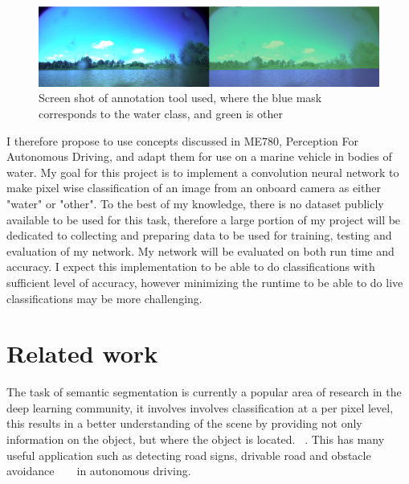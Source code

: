 \documentclass[10pt,twocolumn,letterpaper]{article}
\begin{document}
\begin{figure}[b]	
\begin{center}
  \includegraphics[width=1.0\linewidth]{segmenttool.png}
\end{center}
   \caption{Screen shot of annotation tool used, where the blue mask corresponds to the water class, and green is other}
\label{fig:tool}
\end{figure}

I therefore propose to use concepts discussed in ME780, Perception For Autonomous Driving,
and adapt them for use on a marine vehicle in bodies of water. My goal for this project
is to implement a convolution neural network to make pixel wise classification of an image
from an onboard camera as either "water" or "other". To the best of my knowledge, there is no
dataset publicly available to be used for this task, therefore a large portion of my project will be 
dedicated to collecting and preparing data to be used for training, testing and evaluation of my network. 
My network will be evaluated on both run time and accuracy. I expect this
implementation to be able to do classifications with sufficient level of accuracy, however
minimizing the runtime to be able to do live classifications may be more challenging.


\section{Related work}
The task of semantic segmentation is currently a popular area of research in the deep learning community, 
it involves involves classification at a per pixel level, this results in a better understanding of the scene by providing not only information on the object, but where the object is located. ~\cite{DBLP:journals/corr/Thoma16a}. This has many useful application such as detecting road signs, drivable road and obstacle avoidance  ~\cite{4220659} ~\cite{BMVC2015_109} in autonomous driving. 
\end{document}

